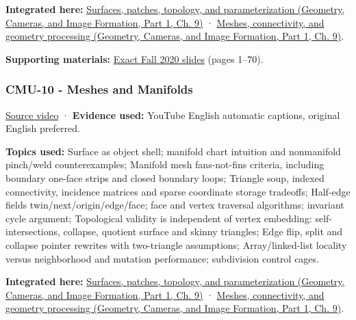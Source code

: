 \textbf{Integrated here:} \href{../03-Geometry-Cameras-and-Image-Formation-P01/main.pdf\#03-visual-computing-i-ch002-surfaces-patches-topology-and-parameterization}{Surfaces, patches, topology, and parameterization (Geometry, Cameras, and Image Formation, Part 1, Ch. 9)} · \href{../03-Geometry-Cameras-and-Image-Formation-P01/main.pdf\#03-visual-computing-i-ch002-meshes-connectivity-and-geometry-processing}{Meshes, connectivity, and geometry processing (Geometry, Cameras, and Image Formation, Part 1, Ch. 9)}.

\textbf{Supporting materials:} \href{https://15462.courses.cs.cmu.edu/fall2020content/lectures/09_introgeometry/09_introgeometry_slides.pdf}{Exact Fall 2020 slides} (pages 1--70).

\subsubsection{CMU-10 - Meshes and Manifolds}\label{04-visual-computing-ii-ch036-cmu-10---meshes-and-manifolds}

\hypertarget{04-visual-computing-ii-ch036-cmu-10---meshes-and-manifolds}{}

\href{https://www.youtube.com/watch?v=HePDHsp8spU}{Source video} · \textbf{Evidence used:} YouTube English automatic captions, original English preferred.

\textbf{Topics used:} Surface as object shell; manifold chart intuition and nonmanifold pinch/weld counterexamples; Manifold mesh fans-not-fins criteria, including boundary one-face strips and closed boundary loops; Triangle soup, indexed connectivity, incidence matrices and sparse coordinate storage tradeoffs; Half-edge fields twin/next/origin/edge/face; face and vertex traversal algorithms; invariant cycle argument; Topological validity is independent of vertex embedding: self-intersections, collapse, quotient surface and skinny triangles; Edge flip, split and collapse pointer rewrites with two-triangle assumptions; Array/linked-list locality versus neighborhood and mutation performance; subdivision control cages.

\textbf{Integrated here:} \href{../03-Geometry-Cameras-and-Image-Formation-P01/main.pdf\#03-visual-computing-i-ch002-surfaces-patches-topology-and-parameterization}{Surfaces, patches, topology, and parameterization (Geometry, Cameras, and Image Formation, Part 1, Ch. 9)} · \href{../03-Geometry-Cameras-and-Image-Formation-P01/main.pdf\#03-visual-computing-i-ch002-meshes-connectivity-and-geometry-processing}{Meshes, connectivity, and geometry processing (Geometry, Cameras, and Image Formation, Part 1, Ch. 9)}.

